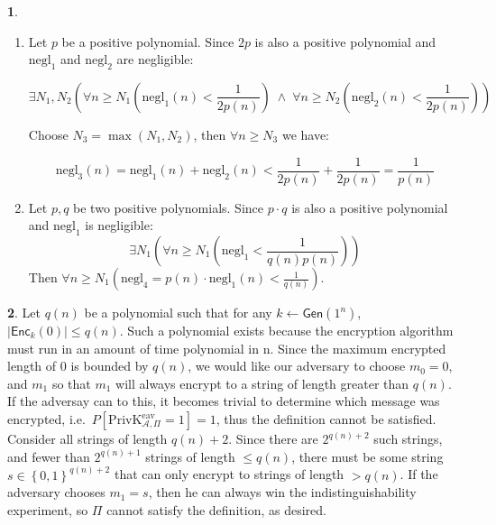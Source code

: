 \documentclass{article}
\theoremstyle{definition}
\newcommand{\AND}{\;\wedge\;}
\newcommand{\set}[1]{\left\{#1\right\}}
\newcommand{\abs}[1]{\left|#1\right|}
\newcommand{\Gen}{\mathsf{Gen}}
\newcommand{\Enc}{\mathsf{Enc}}
\newcommand{\negl}{\mathrm{negl}} %
\newcommand{\priveav}{\text{PrivK}_{\mathcal{A},\Pi}^\text{eav}}
\theoremstyle{definition}
\theoremstyle{definition}
\newtheorem{solution-internal}{}[subsection]
\newenvironment{solution}{
  \begin{solution-internal}
}{
  \end{solution-internal}
}
\begin{document}
\begin{solution}
  $ $
  \begin{enumerate}
    \item Let $p$ be a positive polynomial. Since $2p$ is also a positive polynomial and
  $\negl_1$ and $\negl_2$ are negligible:

  \[ \exists N_1, N_2 \left(\forall n\geqslant N_1 \left(\negl_1(n) <
        \frac{1}{2p(n)} \right) 
\AND \forall n \geqslant N_2 \left(\negl_2(n) < \frac{1}{2p(n)} \right) \right)\]

Choose $N_3 = \max(N_1, N_2)$, then $\forall n \geqslant N_3$ we have:

\[ \negl_3(n) = \negl_1(n) + \negl_2(n) < \frac{1}{2p(n)} + \frac{1}{2p(n)} =
\frac{1}{p(n)} \]
\item Let $p, q$ be two positive polynomials. Since $p\cdot q$ is also a
  positive polynomial and $\negl_1$ is negligible:
  \[ \exists N_1 \left( \forall n \geqslant N_1 \left( \negl_1 <
  \frac{1}{q(n)p(n)} \right)\right) \]
  Then $\forall n \geqslant N_1 \left( \negl_4 = p(n)\cdot \negl_1(n) <
  \frac{1}{q(n)}\right)$.
  \end{enumerate}
\end{solution}
\begin{solution}
  Let $q(n)$ be a polynomial such that for any $k \leftarrow \Gen(1^n)$,
  $\abs{\Enc_k(0)} \leqslant q(n)$. Such a polynomial exists because the
  encryption algorithm must run in an amount of time polynomial in n. Since the
  maximum encrypted length of 0 is bounded by $q(n)$, we would like our
  adversary to choose $m_0 = 0$, and $m_1$ so that $m_1$ will always encrypt to
  a string of length greater than $q(n)$. If the adversay can to this, it
  becomes trivial to determine which message was encrypted, i.e.\ $P[\priveav =
  1] = 1$, thus the definition cannot be satisfied. Consider all strings of
  length $q(n) + 2$. %
  Since there are $2^{q(n) + 2}$ such strings, and fewer than $2^{q(n) + 1}$
  strings of length  $\leqslant q(n)$, there must be some string $s \in
  \set{0,1}^{q(n) + 2}$ that can only encrypt to strings of length $> q(n)$. If
  the adversary chooses $m_1 = s$, then he can always win the
  indistinguishability experiment, so $\Pi$ cannot satisfy the definition, as
  desired.
\end{solution}
\end{document}

